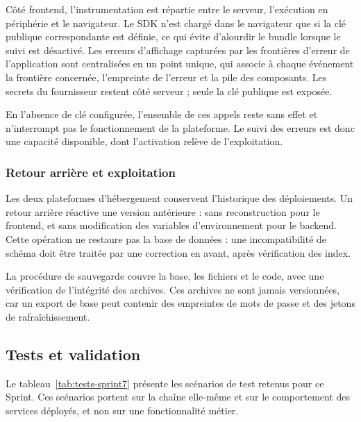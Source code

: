 Côté frontend, l'instrumentation est répartie entre le serveur, l'exécution en périphérie et le navigateur. Le SDK n'est chargé dans le navigateur que si la clé publique correspondante est définie, ce qui évite d'alourdir le bundle lorsque le suivi est désactivé. Les erreurs d'affichage capturées par les frontières d'erreur de l'application sont centralisées en un point unique, qui associe à chaque événement la frontière concernée, l'empreinte de l'erreur et la pile des composants. Les secrets du fournisseur restent côté serveur ; seule la clé publique est exposée.

En l'absence de clé configurée, l'ensemble de ces appels reste sans effet et n'interrompt pas le fonctionnement de la plateforme. Le suivi des erreurs est donc une capacité disponible, dont l'activation relève de l'exploitation.

\subsubsection{Retour arrière et exploitation}

Les deux plateformes d'hébergement conservent l'historique des déploiements. Un retour arrière réactive une version antérieure : sans reconstruction pour le frontend, et sans modification des variables d'environnement pour le backend. Cette opération ne restaure pas la base de données : une incompatibilité de schéma doit être traitée par une correction en avant, après vérification des index.

La procédure de sauvegarde couvre la base, les fichiers et le code, avec une vérification de l'intégrité des archives. Ces archives ne sont jamais versionnées, car un export de base peut contenir des empreintes de mots de passe et des jetons de rafraîchissement.

\subsection{Tests et validation}

Le tableau~\ref{tab:tests-sprint7} présente les scénarios de test retenus pour ce Sprint. Ces scénarios portent sur la chaîne elle-même et sur le comportement des services déployés, et non sur une fonctionnalité métier.

